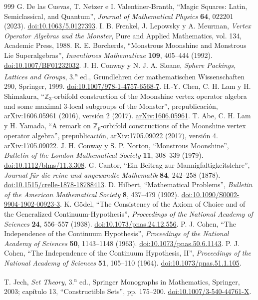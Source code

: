 \begin{thebibliography}{999}
 G. De las Cuevas, T. Netzer e I. Valentiner-Branth, ``Magic Squares: Latin, Semiclassical, and Quantum'', \emph{Journal of Mathematical Physics} \textbf{64}, 022201 (2023). \href{https://doi.org/10.1063/5.0127393}{doi:10.1063/5.0127393}.
 I. B. Frenkel, J. Lepowsky y A. Meurman, \emph{Vertex Operator Algebras and the Monster}, Pure and Applied Mathematics, vol. 134, Academic Press, 1988.
 R. E. Borcherds, ``Monstrous Moonshine and Monstrous Lie Superalgebras'', \emph{Inventiones Mathematicae} \textbf{109}, 405--444 (1992). \href{https://doi.org/10.1007/BF01232032}{doi:10.1007/BF01232032}.
 J. H. Conway y N. J. A. Sloane, \emph{Sphere Packings, Lattices and Groups}, 3.\textsuperscript{a} ed., Grundlehren der mathematischen Wissenschaften 290, Springer, 1999. \href{https://doi.org/10.1007/978-1-4757-6568-7}{doi:10.1007/978-1-4757-6568-7}.
 H.-Y. Chen, C. H. Lam y H. Shimakura, ``\(\mathbb Z_3\)-orbifold construction of the Moonshine vertex operator algebra and some maximal \(3\)-local subgroups of the Monster'', prepublicación, arXiv:1606.05961 (2016), versión 2 (2017). \href{https://arxiv.org/abs/1606.05961}{arXiv:1606.05961}.
 T. Abe, C. H. Lam y H. Yamada, ``A remark on \(\mathbb Z_p\)-orbifold constructions of the Moonshine vertex operator algebra'', prepublicación, arXiv:1705.09022 (2017), versión 4. \href{https://arxiv.org/abs/1705.09022v4}{arXiv:1705.09022}.
 J. H. Conway y S. P. Norton, ``Monstrous Moonshine'', \emph{Bulletin of the London Mathematical Society} \textbf{11}, 308--339 (1979). \href{https://doi.org/10.1112/blms/11.3.308}{doi:10.1112/blms/11.3.308}.
 G. Cantor, ``Ein Beitrag zur Mannigfaltigkeitslehre'',
\emph{Journal für die reine und angewandte Mathematik} \textbf{84},
242--258 (1878). \href{https://doi.org/10.1515/crelle-1878-18788413}{doi:10.1515/crelle-1878-18788413}.
 D. Hilbert, ``Mathematical Problems'',
\emph{Bulletin of the American Mathematical Society} \textbf{8},
437--479 (1902). \href{https://doi.org/10.1090/S0002-9904-1902-00923-3}{doi:10.1090/S0002-9904-1902-00923-3}.
 K. Gödel, ``The Consistency of the Axiom of Choice and
of the Generalized Continuum-Hypothesis'', \emph{Proceedings of the National
Academy of Sciences} \textbf{24}, 556--557 (1938).
\href{https://doi.org/10.1073/pnas.24.12.556}{doi:10.1073/pnas.24.12.556}.
 P. J. Cohen, ``The Independence of the Continuum
Hypothesis'', \emph{Proceedings of the National Academy of Sciences}
\textbf{50}, 1143--1148 (1963).
\href{https://doi.org/10.1073/pnas.50.6.1143}{doi:10.1073/pnas.50.6.1143}.
 P. J. Cohen, ``The Independence of the Continuum
Hypothesis, II'', \emph{Proceedings of the National Academy of Sciences}
\textbf{51}, 105--110 (1964).
\href{https://doi.org/10.1073/pnas.51.1.105}{doi:10.1073/pnas.51.1.105}.

 T. Jech, \emph{Set Theory}, 3.\textsuperscript{a} ed.,
Springer Monographs in Mathematics, Springer, 2003; capítulo 13,
``Constructible Sets'', pp. 175--200.
\href{https://doi.org/10.1007/3-540-44761-X}{doi:10.1007/3-540-44761-X}.

\end{thebibliography}
